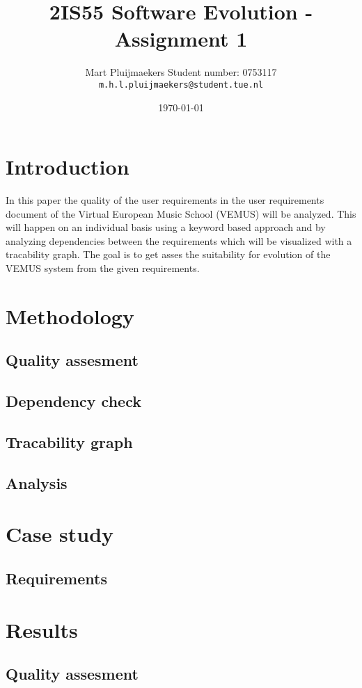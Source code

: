 \documentclass[a4paper,twoside,11pt]{article}
\title{\sffamily\bfseries 2IS55 Software Evolution - Assignment 1}
\author{Mart Pluijmaekers \qquad Student number: 0753117 \\{\tt m.h.l.pluijmaekers@student.tue.nl}}
\date{\today}
\begin{document}
\maketitle
\tableofcontents
\newpage

\section{Introduction}
In this paper the quality of the user requirements in the user requirements document of the Virtual European Music School (VEMUS) will be analyzed. This will happen on an individual basis using a keyword based approach and by analyzing dependencies between the requirements which will be visualized with a tracability graph. The goal is to get asses the suitability for evolution of the VEMUS system from the given requirements. 

\section{Methodology}
\subsection{Quality assesment}
\subsection{Dependency check}
\subsection{Tracability graph}
\subsection{Analysis}

\section{Case study}
\subsection{Requirements}


\section{Results}
\subsection{Quality assesment}
\end{document}
